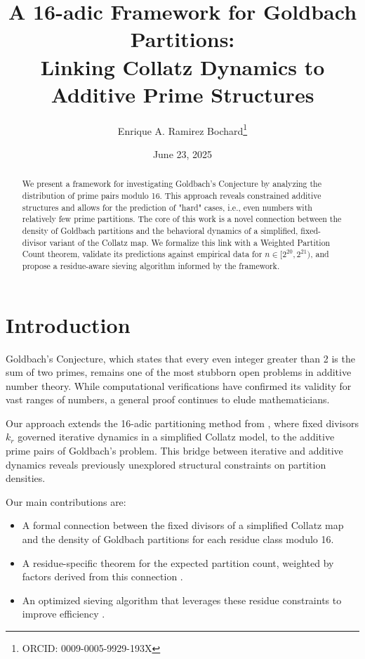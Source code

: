 \documentclass[12pt]{article}
\title{A 16-adic Framework for Goldbach Partitions: \\ Linking Collatz Dynamics to Additive Prime Structures}
\author{Enrique A. Ramirez Bochard\thanks{ORCID: 0009-0005-9929-193X}}
\date{June 23, 2025}
\begin{document}
	
	\maketitle
	
	\begin{abstract}
		We present a framework for investigating Goldbach's Conjecture by analyzing the distribution of prime pairs modulo 16. This approach reveals constrained additive structures and allows for the prediction of "hard" cases, i.e., even numbers with relatively few prime partitions. The core of this work is a novel connection between the density of Goldbach partitions and the behavioral dynamics of a simplified, fixed-divisor variant of the Collatz map. We formalize this link with a Weighted Partition Count theorem, validate its predictions against empirical data for $n \in [2^{20}, 2^{21})$, and propose a residue-aware sieving algorithm informed by the framework.
	\end{abstract}
	
	\section{Introduction}
	
	Goldbach's Conjecture, which states that every even integer greater than 2 is the sum of two primes, remains one of the most stubborn open problems in additive number theory. While computational verifications have confirmed its validity for vast ranges of numbers, a general proof continues to elude mathematicians.  
 
	\vspace{1em}

	Our approach extends the 16-adic partitioning method from \cite{collatz_paper}, where fixed divisors $k_r$ governed iterative dynamics in a simplified Collatz model, to the additive prime pairs of Goldbach's problem. This bridge between iterative and additive dynamics reveals previously unexplored structural constraints on partition densities.  
 
 	\vspace{1em}
 	
	Our main contributions are:
	\begin{itemize}
		\item A formal connection between the fixed divisors of a simplified Collatz map and the density of Goldbach partitions for each residue class modulo 16.
		\item A residue-specific theorem for the expected partition count, weighted by factors derived from this connection .
		\item An optimized sieving algorithm that leverages these residue constraints to improve efficiency .
	\end{itemize}
	
\end{document}
